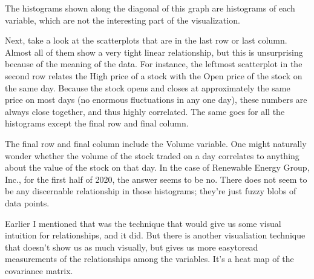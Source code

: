 \documentclass[letterpaper,10pt,english]{jupyterBook}
\begin{document}
\begin{sphinxVerbatim}[commandchars=\\\{\}]
  
\end{sphinxVerbatim}

\noindent{}

\sphinxAtStartPar
The histograms shown along the diagonal of this graph are histograms of each variable, which are not the interesting part of the visualization.

\sphinxAtStartPar
Next, take a look at the scatterplots that are  in the last row or last column.  Almost all of them show a very tight linear relationship, but this is unsurprising because of the meaning of the data.  For instance, the leftmost scatterplot in the second row relates the High price of a stock with the Open price of the stock on the same day.  Because the stock opens and closes at approximately the same price on most days (no enormous fluctuations in any one day), these numbers are always close together, and thus highly correlated.  The same goes for all the histograms except the final row and final column.

\sphinxAtStartPar
The final row and final column include the Volume variable.  One might naturally wonder whether the volume of the stock traded on a day correlates to anything about the value of the stock on that day.  In the case of Renewable Energy Group, Inc., for the first half of 2020, the answer seems to be no.  There does not seem to be any discernable relationship in those histograms; they’re just fuzzy blobs of data points.

\sphinxAtStartPar
Earlier I mentioned that  was the technique that would give us some visual intuition for relationships, and it did.  But there is another visualiation technique that doesn’t show us as much visually, but gives us more easy\sphinxhyphen{}to\sphinxhyphen{}read measurements of the relationships among the variables.  It’s a heat map of the covariance matrix.
\end{document}
